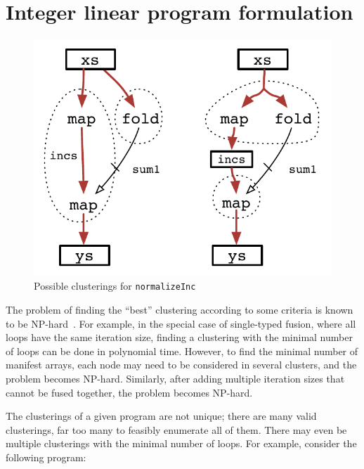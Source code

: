 \section{Integer linear program formulation}
\label{s:ILP}

\begin{figure}[ht!]
\begin{center}
\includegraphics[scale=0.5]{figures/ex2-normalizeInc.pdf}
\end{center}
\caption{Possible clusterings for \texttt{normalizeInc}}
\label{f:normInc}
\end{figure}

The problem of finding the ``best'' clustering according to some criteria is known to be NP-hard~\cite{darte1999complexity}.
For example, in the special case of single-typed fusion, where all loops have the same iteration size, finding a clustering with the minimal number of loops can be done in polynomial time.
However, to find the minimal number of manifest arrays, each node may need to be considered in several clusters, and the problem becomes NP-hard.
Similarly, after adding multiple iteration sizes that cannot be fused together, the problem becomes NP-hard.

The clusterings of a given program are not unique; there are many valid clusterings, far too many to feasibly enumerate all of them.
There may even be multiple clusterings with the minimal number of loops. For example, consider the following program:

